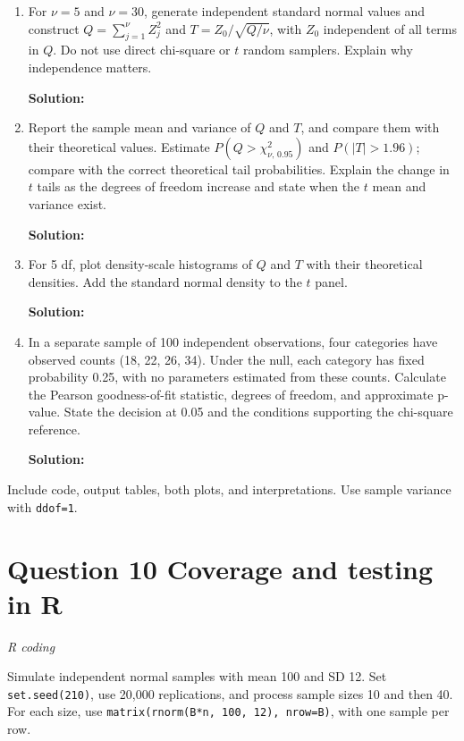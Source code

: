 \documentclass[11pt]{article}
\newcommand{\solution}{\par\medskip\noindent\textbf{Solution:}\par\vspace{0cm}}
\begin{document}
\begin{enumerate}[label=\textbf{(\alph*)}]
  \item For $\nu = 5$ and $\nu = 30$, generate independent standard normal values and construct $Q = \sum_{j=1}^{\nu} Z_j^2$ and $T = Z_0 / \sqrt{Q/\nu}$, with $Z_0$ independent of all terms in $Q$. Do not use direct chi-square or $t$ random samplers. Explain why independence matters.
  \solution

  \item Report the sample mean and variance of $Q$ and $T$, and compare them with their theoretical values. Estimate $P(Q > \chi^2_{\nu,\,0.95})$ and $P(|T| > 1.96)$; compare with the correct theoretical tail probabilities. Explain the change in $t$ tails as the degrees of freedom increase and state when the $t$ mean and variance exist.
  \solution

  \item For 5 df, plot density-scale histograms of $Q$ and $T$ with their theoretical densities. Add the standard normal density to the $t$ panel.
  \solution

  \item In a separate sample of 100 independent observations, four categories have observed counts (18, 22, 26, 34). Under the null, each category has fixed probability 0.25, with no parameters estimated from these counts. Calculate the Pearson goodness-of-fit statistic, degrees of freedom, and approximate p-value. State the decision at 0.05 and the conditions supporting the chi-square reference.
  \solution
\end{enumerate}

Include code, output tables, both plots, and interpretations. Use sample variance with \texttt{ddof=1}.

\newpage
\section*{Question 10 \quad Coverage and testing in R}
\textit{R coding}

Simulate independent normal samples with mean 100 and SD 12. Set \texttt{set.seed(210)}, use 20,000 replications, and process sample sizes 10 and then 40. For each size, use \texttt{matrix(rnorm(B*n, 100, 12), nrow=B)}, with one sample per row.
\end{document}
